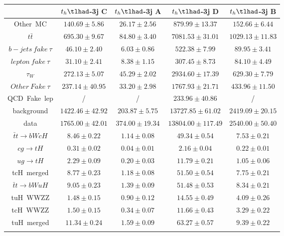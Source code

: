 \begin{tabular}{ccccc} \toprule\toprule
 & $t_{h}\tlhad$-3j C & $t_{h}\tlhad$-3j A & $t_{h}\tlhad$-3j D & $t_{h}\tlhad$-3j B\\\midrule
Other~MC & $140.69\pm5.86$ & $26.17\pm2.56$ & $879.99\pm13.37$ & $152.66\pm6.44$\\
$t\bar{t}$ & $695.30\pm9.67$ & $84.80\pm3.40$ & $7081.53\pm31.01$ & $1029.13\pm11.83$\\
$b-jets~fake~\tau$ & $46.10\pm2.40$ & $6.03\pm0.86$ & $522.38\pm7.99$ & $89.95\pm3.41$\\
$lepton~fake~\tau$ & $31.10\pm2.41$ & $8.38\pm1.15$ & $307.45\pm8.73$ & $84.10\pm4.49$\\
$\tau_{W}$ & $272.13\pm5.07$ & $45.29\pm2.02$ & $2934.60\pm17.39$ & $629.30\pm7.79$\\
$Other~Fake~\tau$ & $237.14\pm40.95$ & $33.20\pm2.98$ & $1767.93\pm21.71$ & $433.96\pm11.50$\\
QCD~Fake~lep &  / &  / & $233.96\pm40.86$ &  /\\
background & $1422.46\pm42.92$ & $203.87\pm5.75$ & $13727.85\pm61.02$ & $2419.09\pm20.15$\\
data & $1765.00\pm42.01$ & $374.00\pm19.34$ & $13804.00\pm117.49$ & $2540.00\pm50.40$\\
$\bar{t}t\to bWcH$ & $8.46\pm0.22$ & $1.14\pm0.08$ & $49.34\pm0.54$ & $7.53\pm0.21$\\
$cg\to tH$ & $0.31\pm0.02$ & $0.04\pm0.01$ & $2.16\pm0.04$ & $0.22\pm0.01$\\
$ug\to tH$ & $2.29\pm0.09$ & $0.20\pm0.03$ & $11.79\pm0.21$ & $1.05\pm0.06$\\
tcH~merged & $8.77\pm0.23$ & $1.18\pm0.08$ & $51.50\pm0.54$ & $7.75\pm0.21$\\
$\bar{t}t\to bWuH$ & $9.05\pm0.23$ & $1.39\pm0.09$ & $51.48\pm0.53$ & $8.34\pm0.21$\\
tuH~WWZZ & $1.48\pm0.15$ & $0.90\pm0.12$ & $14.55\pm0.49$ & $4.09\pm0.26$\\
tcH~WWZZ & $1.50\pm0.15$ & $0.34\pm0.07$ & $11.66\pm0.43$ & $3.29\pm0.22$\\
tuH~merged & $11.34\pm0.24$ & $1.59\pm0.09$ & $63.27\pm0.57$ & $9.39\pm0.22$\\
\bottomrule\bottomrule\\
\end{tabular}
